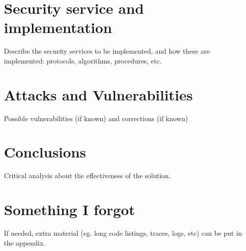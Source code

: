 \documentclass[english]{article}
\begin{document}
\section{Security service and implementation}
Describe the security services to be implemented, and how these are implemented: protocols, algorithms, procedures, etc.


\section{Attacks and Vulnerabilities}
Possible vulnerabilities (if known) and corrections (if known)


\section{Conclusions}
Critical analysis about the effectiveness of the solution.

\appendix
\section{Something I forgot}
If needed, extra material (eg. long code listings, traces, logs, etc) can be put in the appendix.


\printbibliography
\end{document}
